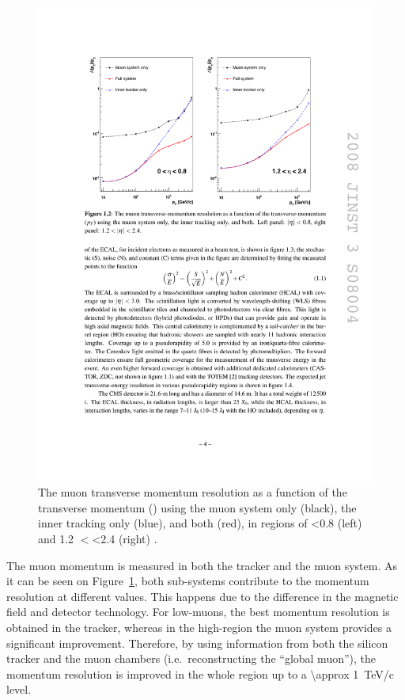 \begin{figure}[htbp]
  \centering
  \leavevmode
  \includegraphics[width=\columnwidth]{muon_resolution}
  \caption{The muon transverse momentum resolution as a function of the transverse momentum (\pt) using the muon
  system only (black), the inner tracking only (blue), and both (red), in regions of \abs\eta \num{<0.8} (left) and
  \num{1.2} $<$\abs\eta\num{<2.4} (right) \autocite{CMS}.}
  \label{fig:muon_resolution}
\end{figure}

The muon momentum is measured in both the tracker and the muon system.  As it can be seen on
Figure~\ref{fig:muon_resolution}, both sub-systems contribute to the momentum resolution at different \pt values. This
happens due to the difference in the magnetic field and detector technology. For low-\pt muons, the best momentum
resolution is obtained in the tracker, whereas in the high-\pt region the muon system provides a significant
improvement. Therefore, by using information from both the silicon tracker and the muon chambers (i.e.\ reconstructing
the ``global muon''), the momentum resolution is improved in the whole \pt region up to a \SI{\approx 1}{\TeV/c} level.

